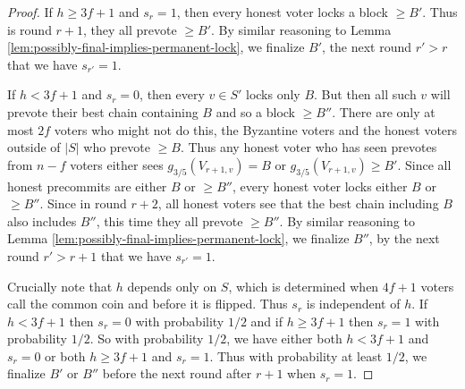 \documentclass[a4paper,UKenglish,cleveref, autoref, thm-restate, anonymous]{lipics-v2019}
\begin{document}
{\begin{proof}
If $h \geq 3f+1$ and $s_r=1$, then every honest voter locks a block $\geq B'$. Thus is round $r+1$, they all prevote $\geq B'$.
 By similar reasoning to Lemma \ref{lem:possibly-final-implies-permanent-lock}, we finalize $B'$, the next round $r' > r$ that we have $s_{r'}=1$.
 
If $h < 3f+1$ and $s_r=0$, then every $v \in S'$ locks only $B$. But then all such $v$ will prevote their best chain containing $B$ and so a block $\geq B''$. There are only at most $2f$ voters who might not do this, the Byzantine voters and the honest voters outside of $|S|$ who prevote $\geq B$. Thus any honest voter who has seen prevotes from $n-f$ voters either sees $g_{3/5}(V_{r+1,v})=B$ or $g_{3/5}(V_{r+1,v}) \geq B'$. Since all honest precommits are either $B$ or $\geq B''$, every honest voter locks either $B$ or $\geq B''$. Since in round $r+2$, all honest voters see that the best chain including $B$ also includes $B''$, this time they all prevote $\geq B''$.  By similar reasoning to Lemma \ref{lem:possibly-final-implies-permanent-lock}, we finalize $B''$, by the next round $r' > r+1$ that we have $s_{r'}=1$.

Crucially note that $h$ depends only on $S$, which is determined when $4f+1$ voters call the common coin and before it is flipped. Thus $s_r$ is independent of $h$. If $h < 3f+1$ then $s_r=0$ with probability $1/2$ and if $h \geq 3f+1$ then $s_r=1$ with probability $1/2$. So with probability $1/2$, we have either both $h < 3f+1$ and $s_r=0$ or both $h \geq 3f+1$ and $s_r=1$. Thus with probability at least $1/2$, we finalize $B'$ or $B''$ before the next round after $r+1$ when $s_r=1$.
\end{proof}
}


\end{document}
